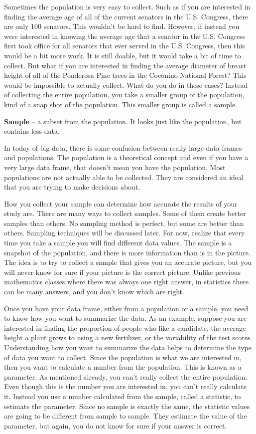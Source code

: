\documentclass[
]{book}
\begin{document}
Sometimes the population is very easy to collect. Such as if you are interested in finding the average age of all of the current senators in the U.S. Congress, there are only 100 senators. This wouldn't be hard to find. However, if instead you were interested in knowing the average age that a senator in the U.S. Congress first took office for all senators that ever served in the U.S. Congress, then this would be a bit more work. It is still doable, but it would take a bit of time to collect. But what if you are interested in finding the average diameter of breast height of all of the Ponderosa Pine trees in the Coconino National Forest? This would be impossible to actually collect. What do you do in these cases? Instead of collecting the entire population, you take a smaller group of the population, kind of a snap shot of the population. This smaller group is called a sample.

\textbf{Sample} -- a subset from the population. It looks just like the population, but contains less data.

In today of big data, there is some confusion between really large data frames and populations. The population is a theoretical concept and even if you have a very large data frame, that doesn't mean you have the population. Most populations are not actually able to be collected. They are considered an ideal that you are trying to make decisions about.

How you collect your sample can determine how accurate the results of your study are. There are many ways to collect samples. Some of them create better samples than others. No sampling method is perfect, but some are better than others. Sampling techniques will be discussed later. For now, realize that every time you take a sample you will find different data values. The sample is a snapshot of the population, and there is more information than is in the picture. The idea is to try to collect a sample that gives you an accurate picture, but you will never know for sure if your picture is the correct picture. Unlike previous mathematics classes where there was always one right answer, in statistics there can be many answers, and you don't know which are right.

Once you have your data frame, either from a population or a sample, you need to know how you want to summarize the data. As an example, suppose you are interested in finding the proportion of people who like a candidate, the average height a plant grows to using a new fertilizer, or the variability of the test scores. Understanding how you want to summarize the data helps to determine the type of data you want to collect. Since the population is what we are interested in, then you want to calculate a number from the population. This is known as a parameter. As mentioned already, you can't really collect the entire population. Even though this is the number you are interested in, you can't really calculate it. Instead you use a number calculated from the sample, called a statistic, to estimate the parameter. Since no sample is exactly the same, the statistic values are going to be different from sample to sample. They estimate the value of the parameter, but again, you do not know for sure if your answer is correct.
\end{document}
